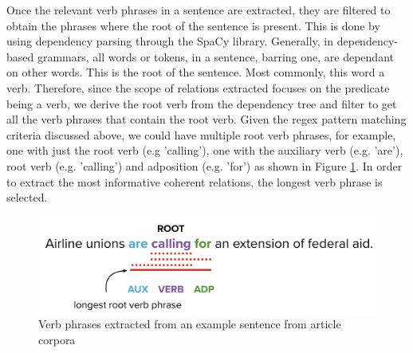 
Once the relevant verb phrases in a sentence are extracted, they are filtered to obtain the phrases where the root of the sentence is present. This is done by using dependency parsing through the SpaCy library. Generally, in dependency-based grammars, all words or tokens, in a sentence,  barring one,  are dependant on other words.  This is the root  of the sentence. Most commonly, this word a verb. Therefore, since the scope of relations extracted focuses on the predicate being a verb, we derive the root verb from the dependency tree and filter to get all the verb phrases that contain the root verb. Given the regex pattern matching criteria discussed above, we could have multiple root verb phrases, for example, one with just the root verb (e.g 'calling'), one with the auxiliary verb (e.g. 'are'), root verb (e.g. 'calling') and adposition (e.g. 'for') as shown in Figure \ref{verb_phrases}. In order to extract the most informative coherent relations, the longest verb phrase is selected.  

\begin{figure}[H]
\centering
\includegraphics[scale=0.4]{images/verb_phrases.png}
\caption{Verb phrases extracted from an example sentence from article corpora}
\label{verb_phrases}
\end{figure}

